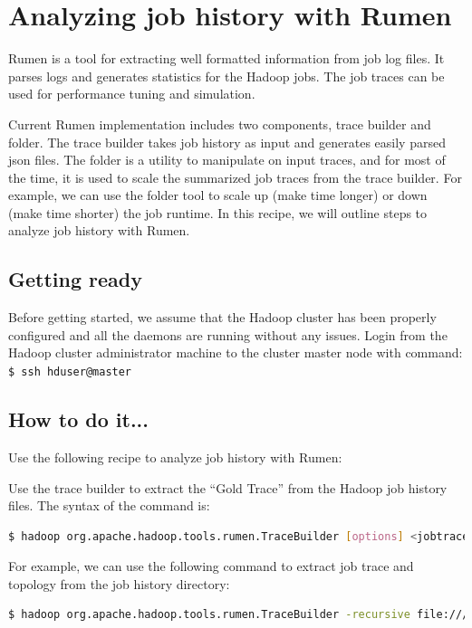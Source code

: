 \section{Analyzing job history with Rumen}
Rumen is a tool for extracting well formatted information from job log files. It parses logs and generates statistics for the Hadoop jobs. The job traces can be used for performance tuning and simulation.

Current Rumen implementation includes two components, trace builder and folder. The trace builder takes job history as input and generates easily parsed json files. The folder is a utility to manipulate on input traces, and for most of the time, it is used to scale the summarized job traces from the trace builder. For example, we can use the folder tool to scale up (make time longer) or down (make time shorter) the job runtime. In this recipe, we will outline steps to analyze job history with Rumen.

\subsection*{Getting ready}
Before getting started, we assume that the Hadoop cluster has been properly configured and all the daemons are running without any issues.
Login from the Hadoop cluster administrator machine to the cluster master node with command: \\
\verb|$ ssh hduser@master|

\subsection*{How to do it...}
Use the following recipe to analyze job history with Rumen:

Use the trace builder to extract the ``Gold Trace'' from the Hadoop job history files. The syntax of the command is:
\lstset{style=bashstyle}
\begin{lstlisting}[language=bash]
$ hadoop org.apache.hadoop.tools.rumen.TraceBuilder [options] <jobtrace-output> <topology-output> <inputs>
\end{lstlisting}

For example, we can use the following command to extract job trace and topology from the job history directory:
\lstset{style=bashstyle}
\begin{lstlisting}[language=bash]$ hadoop org.apache.hadoop.tools.rumen.TraceBuilder -recursive file:///tmp/jobtraces.json file:///tmp/topology.out file:///usr/local/hadoop/logs/history/done
\end{lstlisting}

